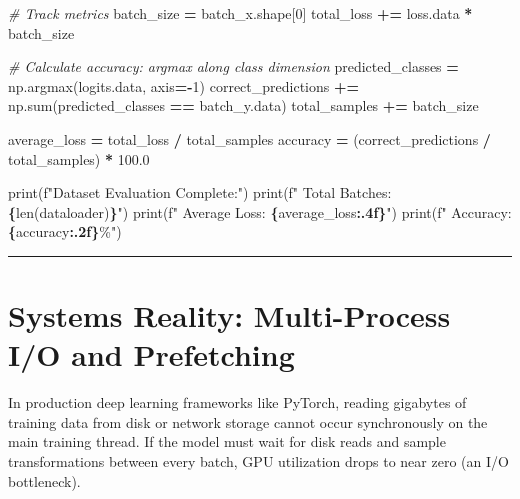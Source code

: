 \documentclass[
  letterpaper,
]{scrbook}
\newenvironment{Shaded}{\begin{snugshade}}{\end{snugshade}}
\newcommand{\BuiltInTok}[1]{#1}
\newcommand{\CommentTok}[1]{\textcolor[rgb]{0.56,0.35,0.01}{\textit{#1}}}
\newcommand{\DecValTok}[1]{\textcolor[rgb]{0.00,0.00,0.81}{#1}}
\newcommand{\FloatTok}[1]{\textcolor[rgb]{0.00,0.00,0.81}{#1}}
\newcommand{\NormalTok}[1]{#1}
\newcommand{\OperatorTok}[1]{\textcolor[rgb]{0.81,0.36,0.00}{\textbf{#1}}}
\newcommand{\SpecialCharTok}[1]{\textcolor[rgb]{0.81,0.36,0.00}{\textbf{#1}}}
\newcommand{\SpecialStringTok}[1]{\textcolor[rgb]{0.31,0.60,0.02}{#1}}
\begin{document}
\begin{Shaded}
\begin{Highlighting}[]
    \CommentTok{\# Track metrics}
\NormalTok{    batch\_size }\OperatorTok{=}\NormalTok{ batch\_x.shape[}\DecValTok{0}\NormalTok{]}
\NormalTok{    total\_loss }\OperatorTok{+=}\NormalTok{ loss.data }\OperatorTok{*}\NormalTok{ batch\_size}

    \CommentTok{\# Calculate accuracy: argmax along class dimension}
\NormalTok{    predicted\_classes }\OperatorTok{=}\NormalTok{ np.argmax(logits.data, axis}\OperatorTok{={-}}\DecValTok{1}\NormalTok{)}
\NormalTok{    correct\_predictions }\OperatorTok{+=}\NormalTok{ np.}\BuiltInTok{sum}\NormalTok{(predicted\_classes }\OperatorTok{==}\NormalTok{ batch\_y.data)}
\NormalTok{    total\_samples }\OperatorTok{+=}\NormalTok{ batch\_size}

\NormalTok{average\_loss }\OperatorTok{=}\NormalTok{ total\_loss }\OperatorTok{/}\NormalTok{ total\_samples}
\NormalTok{accuracy }\OperatorTok{=}\NormalTok{ (correct\_predictions }\OperatorTok{/}\NormalTok{ total\_samples) }\OperatorTok{*} \FloatTok{100.0}

\BuiltInTok{print}\NormalTok{(}\SpecialStringTok{f"Dataset Evaluation Complete:"}\NormalTok{)}
\BuiltInTok{print}\NormalTok{(}\SpecialStringTok{f"  Total Batches: }\SpecialCharTok{\{}\BuiltInTok{len}\NormalTok{(dataloader)}\SpecialCharTok{\}}\SpecialStringTok{"}\NormalTok{)}
\BuiltInTok{print}\NormalTok{(}\SpecialStringTok{f"  Average Loss:  }\SpecialCharTok{\{}\NormalTok{average\_loss}\SpecialCharTok{:.4f\}}\SpecialStringTok{"}\NormalTok{)}
\BuiltInTok{print}\NormalTok{(}\SpecialStringTok{f"  Accuracy:      }\SpecialCharTok{\{}\NormalTok{accuracy}\SpecialCharTok{:.2f\}}\SpecialStringTok{\%"}\NormalTok{)}
\end{Highlighting}
\end{Shaded}

\begin{center}\rule{0.5\linewidth}{0.5pt}\end{center}

\section{Systems Reality: Multi-Process I/O and
Prefetching}\label{systems-reality-multi-process-io-and-prefetching}

In production deep learning frameworks like PyTorch, reading gigabytes
of training data from disk or network storage cannot occur synchronously
on the main training thread. If the model must wait for disk reads and
sample transformations between every batch, GPU utilization drops to
near zero (an I/O bottleneck).
\end{document}

